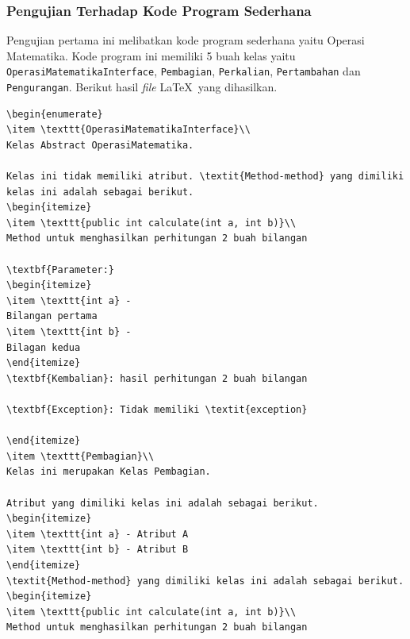 \documentclass[a4paper,twoside]{article}
\begin{document}
\begin{enumerate}
\subsubsection{Pengujian Terhadap Kode Program Sederhana}
\label{sec:pengujian sederhana}
Pengujian pertama ini melibatkan kode program sederhana yaitu Operasi Matematika. Kode program ini memiliki 5 buah kelas yaitu \texttt{OperasiMatematikaInterface}, \texttt{Pembagian}, \texttt{Perkalian}, \texttt{Pertambahan} dan \texttt{Pengurangan}. Berikut hasil {\it file} \LaTeX\ yang dihasilkan.
\begin{lstlisting}[caption=Hasil Pengujian Pertama]
\begin{enumerate}
\item \texttt{OperasiMatematikaInterface}\\ 
Kelas Abstract OperasiMatematika.

Kelas ini tidak memiliki atribut. \textit{Method-method} yang dimiliki kelas ini adalah sebagai berikut.
\begin{itemize}
\item \texttt{public int calculate(int a, int b)}\\ 
Method untuk menghasilkan perhitungan 2 buah bilangan

\textbf{Parameter:}
\begin{itemize}
\item \texttt{int a} - 
Bilangan pertama
\item \texttt{int b} - 
Bilagan kedua
\end{itemize}
\textbf{Kembalian}: hasil perhitungan 2 buah bilangan

\textbf{Exception}: Tidak memiliki \textit{exception}

\end{itemize}
\item \texttt{Pembagian}\\ 
Kelas ini merupakan Kelas Pembagian.

Atribut yang dimiliki kelas ini adalah sebagai berikut.
\begin{itemize}
\item \texttt{int a} - Atribut A
\item \texttt{int b} - Atribut B
\end{itemize}
\textit{Method-method} yang dimiliki kelas ini adalah sebagai berikut.
\begin{itemize}
\item \texttt{public int calculate(int a, int b)}\\ 
Method untuk menghasilkan perhitungan 2 buah bilangan


\end{lstlisting}
\end{enumerate}
\end{document}

